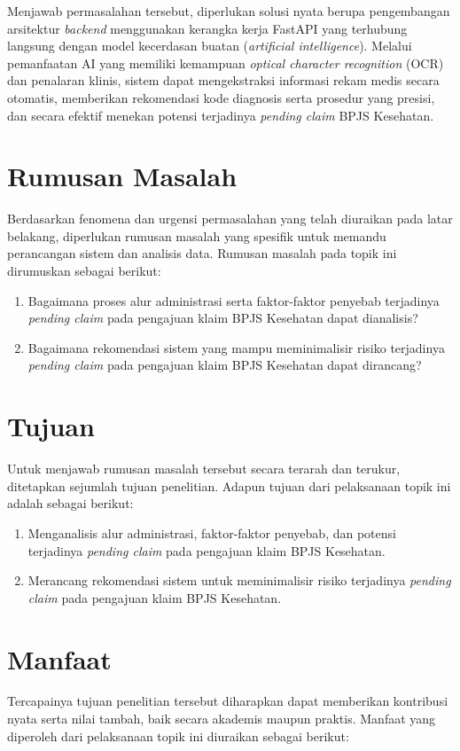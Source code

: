 Menjawab permasalahan tersebut, diperlukan solusi nyata berupa pengembangan arsitektur \textit{backend} menggunakan kerangka kerja FastAPI yang terhubung langsung dengan model kecerdasan buatan (\textit{artificial intelligence}). Melalui pemanfaatan AI yang memiliki kemampuan \textit{optical character recognition} (OCR) dan penalaran klinis, sistem dapat mengekstraksi informasi rekam medis secara otomatis, memberikan rekomendasi kode diagnosis serta prosedur yang presisi, dan secara efektif menekan potensi terjadinya \textit{pending claim} BPJS Kesehatan.

\section{Rumusan Masalah}
Berdasarkan fenomena dan urgensi permasalahan yang telah diuraikan pada latar belakang, diperlukan rumusan masalah yang spesifik untuk memandu perancangan sistem dan analisis data. Rumusan masalah pada topik ini dirumuskan sebagai berikut:
\begin{enumerate}
    \item Bagaimana proses alur administrasi serta faktor-faktor penyebab terjadinya \textit{pending claim} pada pengajuan klaim BPJS Kesehatan dapat dianalisis?
    \item Bagaimana rekomendasi sistem yang mampu meminimalisir risiko terjadinya \textit{pending claim} pada pengajuan klaim BPJS Kesehatan dapat dirancang?
\end{enumerate}

\section{Tujuan}
Untuk menjawab rumusan masalah tersebut secara terarah dan terukur, ditetapkan sejumlah tujuan penelitian. Adapun tujuan dari pelaksanaan topik ini adalah sebagai berikut:
\begin{enumerate}
    \item Menganalisis alur administrasi, faktor-faktor penyebab, dan potensi terjadinya \textit{pending claim} pada pengajuan klaim BPJS Kesehatan.
    \item Merancang rekomendasi sistem untuk meminimalisir risiko terjadinya \textit{pending claim} pada pengajuan klaim BPJS Kesehatan.
\end{enumerate}

\section{Manfaat}
Tercapainya tujuan penelitian tersebut diharapkan dapat memberikan kontribusi nyata serta nilai tambah, baik secara akademis maupun praktis. Manfaat yang diperoleh dari pelaksanaan topik ini diuraikan sebagai berikut:

